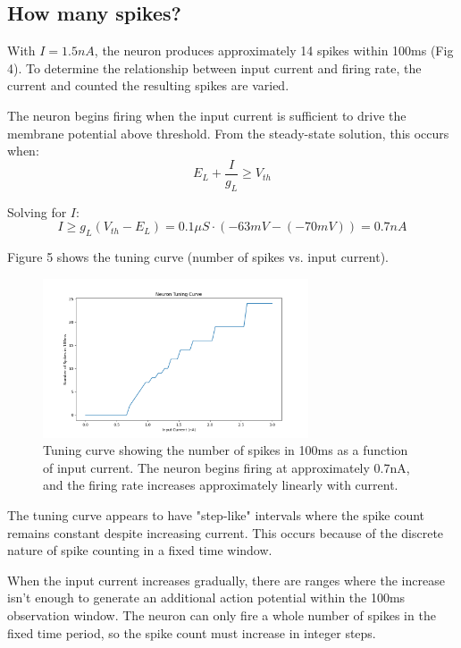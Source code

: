 \documentclass[11pt,a4paper]{article}
\begin{document}
\subsection{How many spikes?}

With $I = 1.5nA$, the neuron produces approximately 14 spikes within 100ms (Fig 4). To determine the relationship between input current and firing rate, the current and counted the resulting spikes are varied.

The neuron begins firing when the input current is sufficient to drive the membrane potential above threshold. From the steady-state solution, this occurs when:
\begin{equation}
E_L + \frac{I}{g_L} \geq V_{th}
\end{equation}

Solving for $I$:
\begin{equation}
I \geq g_L(V_{th} - E_L) = 0.1\mu S \cdot (-63mV - (-70mV)) = 0.7nA
\end{equation}

Figure 5 shows the tuning curve (number of spikes vs. input current).

\begin{figure}[H]
\centering
\includegraphics[width=0.7\textwidth]{fig5.png}
\caption{Tuning curve showing the number of spikes in 100ms as a function of input current. The neuron begins firing at approximately 0.7nA, and the firing rate increases approximately linearly with current.}
\label{fig:tuning_curve}
\end{figure}

The tuning curve appears to have "step-like" intervals where the spike count remains constant despite increasing current. This occurs because of the discrete nature of spike counting in a fixed time window.


When the input current increases gradually, there are ranges where the increase isn't enough to generate an additional action potential within the 100ms observation window. The neuron can only fire a whole number of spikes in the fixed time period, so the spike count must increase in integer steps.
\end{document}
